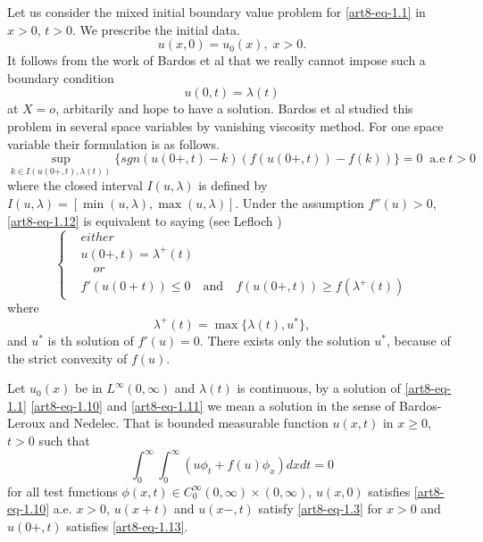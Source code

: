 Let us consider the mixed initial boundary value problem for \eqref{art8-eq-1.1} in $x >0$, $t > 0$. We prescribe the initial data.
\begin{equation}\label{art8-eq-1.10}
u(x, 0) = u_{0}(x), \; x > 0.
\end{equation}
It follows from the work of Bardos et al \cite{art8-key1} that we really cannot impose such a boundary condition
\begin{equation}\label{art8-eq-1.11}
u(0,t)= \lambda(t)
\end{equation}
at $X=o$, arbitarily and hope to have a solution. Bardos et al studied this problem in several space variables by vanishing viscosity method. For one space variable their formulation is as follows.
\begin{equation}\label{art8-eq-1.12}
\sup\limits_{k\in I(u(0+,t), \lambda(t))}\{sgn (u(0+,t)-k)(f(u(0+,t))-f(k))\} =0 \;\; \text{a.e} \;t > 0
\end{equation}
where the closed interval $I(u, \lambda)$ is defined by $I(u, \lambda) = [\min(u, \lambda), \max(u, \lambda)]$. Under the assumption $f''(u)> 0$, \eqref{art8-eq-1.12} is equivalent to saying (see Lefloch \cite{art8-key10})
\begin{equation}\label{art8-eq-1.13}
\left\{
\begin{aligned}
& either\\
 & u(0+, t)= \lambda^{+}(t)\\
& \quad {or}\\
 & f'(u(0+t))\leq 0 \quad \text{and}\quad f(u(0+,t))\geq f(\lambda^{+}(t))
\end{aligned}
\right.
\end{equation}
where
\begin{equation}\label{art8-eq-1.14}
\lambda^{+}(t) = \max\{\lambda(t), u^{*}\},
\end{equation}
and $u^{*}$ is th solution of $f'(u) =0$. There exists only the solution $u^{*}$, because of the strict convexity of $f(u)$.

\begin{defi*}
Let $u_{0}(x)$ be in $L^{\infty}(0, \infty)$ and $\lambda(t)$ is continuous, by a solution of \eqref{art8-eq-1.1}
\eqref{art8-eq-1.10} and \eqref{art8-eq-1.11} we mean a solution in the sense of Bardos-Leroux and Nedelec. That is bounded measurable function $u(x,t)$ in $x\geq 0$, $t>0$ such that
\begin{equation}\label{art8-eq-1.15}
\int_{0}^{\infty} \int_{0}^{\infty}(u\phi_{t} + f(u)\phi_{x})dxdt =0
\end{equation}
 for all test functions $\phi(x,t) \in C_{0}^{\infty}(0,\infty) \times (0,\infty)$, $u(x, 0)$ satisfies
\eqref{art8-eq-1.10} a.e. $x>0$, $u(x+t)$ and $u(x-,t)$ satisfy \eqref{art8-eq-1.3} for $x>0$ and $u(0+, t)$ satisfies  \eqref{art8-eq-1.13}.
\end{defi*}

